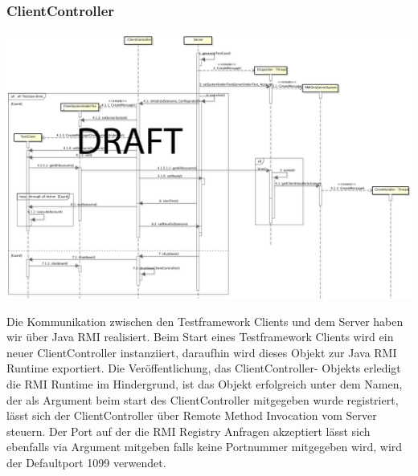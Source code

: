 \subsubsection{ClientController}
\label{sec:clientController}

\begin{center}
\includegraphics[scale=0.3]{image_testFramework/TestFWServerClientSeq.png}
\end{center}
 
Die Kommunikation zwischen den Testframework Clients und dem Server haben wir über Java RMI realisiert. Beim Start eines Testframework Clients wird ein neuer ClientController instanziiert, daraufhin wird dieses Objekt zur Java RMI Runtime exportiert. Die Veröffentlichung, das ClientController- Objekts erledigt die RMI Runtime im Hindergrund, ist das Objekt erfolgreich unter dem Namen, der als Argument beim start des ClientController mitgegeben wurde registriert, lässt sich der ClientController über Remote Method Invocation vom Server steuern. Der Port auf der die RMI Registry Anfragen akzeptiert lässt sich ebenfalls via Argument mitgeben falls keine Portnummer mitgegeben wird, wird der Defaultport 1099 verwendet.

